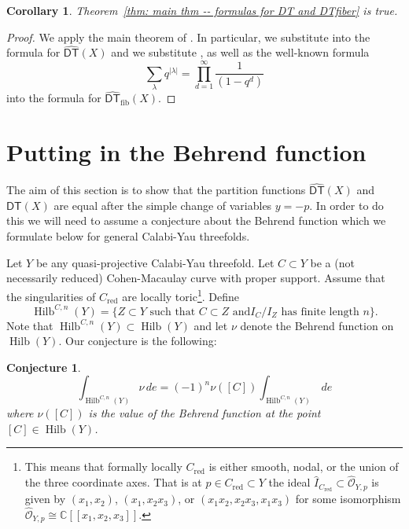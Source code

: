 \documentclass{amsart}
\newtheorem{conjecture}[theorem]{Conjecture}
\newtheorem{corollary}[theorem]{Corollary}
\theoremstyle{definition}
\newcommand{\CC} {\mathbb{C}}          %
\newcommand{\Hilb}{\operatorname{Hilb}}
\newcommand{\DT}{\mathsf{DT}}
\newcommand{\DThat}{\widehat{\DT}}
\newcommand{\fiber}{\mathrm{fib}}
\newcommand{\red}{\mathrm{red}}
\begin{document}
\begin{corollary}
Theorem~\ref{thm: main thm -- formulas for DT and DTfiber} is true.
\end{corollary}
\begin{proof}
We apply the main theorem of \cite{BKY}. In particular, we substitute
\cite[Eqns~(2)\&(4)]{BKY} into the formula for $\DThat (X)$ and we substitute
\cite[Eqn~(1)]{BKY}, as well as the well-known formula
\[
\sum_{\lambda}q^{|\lambda |} =\prod_{d=1}^{\infty}\frac{1}{(1-q^{d})}
\]
into the formula for $\DThat_{\fiber } (X)$.
\end{proof}

\section{Putting in the Behrend function} \label{sec: Behrend}

The aim of this section is to show that the partition functions
$\DThat (X)$ and $\DT (X)$ are equal after the simple change of
variables $y=-p$. In order to do this we will need to assume a
conjecture about the Behrend function which we formulate below for
general Calabi-Yau threefolds.

Let $Y$ be any quasi-projective Calabi-Yau
threefold.  Let $C\subset Y$ be a (not necessarily reduced)
Cohen-Macaulay curve with proper support. Assume that the
singularities of $C_{\red}$ are locally toric\footnote{This means that
formally locally $C_{\red}$ is either smooth, nodal, or the union of
the three coordinate axes. That is at $p\in C_{\red}\subset Y$ the
ideal $\widehat{I}_{C_{\red}}\subset \widehat{\mathcal{O}}_{Y,p}$ is
given by $(x_{1},x_{2})$, $(x_{1},x_{2}x_{3})$, or
$(x_{1}x_{2},x_{2}x_{3},x_{1}x_{3})$ for some isomorphism
$\widehat{\mathcal{O}}_{Y,p}\cong \CC
[[x_{1},x_{2},x_{3}]]$. }. Define\emph{
\[
\Hilb^{C,n}(Y) = \{Z\subset Y \text{ such that $C\subset Z$ and
$I_{C}/I_{Z}$ has finite length $n$} \}.
\]
}
Note that $\Hilb^{C,n}(Y)\subset \Hilb (Y)$ and let $\nu$ denote the
Behrend function on $\Hilb (Y)$. Our conjecture is the following:

\begin{conjecture}\label{conj: Behrend fnc conj}
\[
\int_{\Hilb^{C,n}(Y)} \nu \, de = (-1)^{n} \nu ([C]) \int_{\Hilb^{C,n}(Y)} \, de
\]
where $\nu ([C])$ is the value of the Behrend function at the point $[C]\in \Hilb (Y)$.
\end{conjecture}
\end{document}
